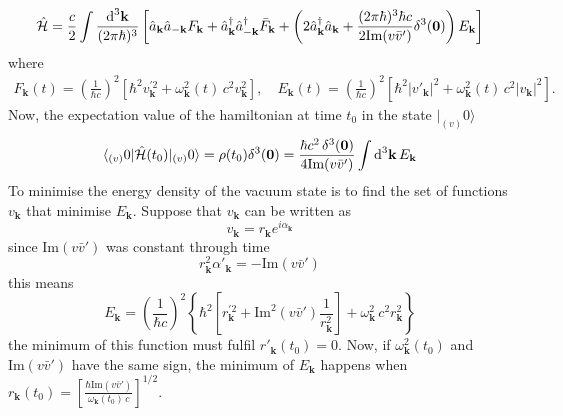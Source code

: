 \begin{equation}
	\hat{\mathcal{H}}=\frac{c}{2}\int\frac{\text{d}^3\mathbf{k}}{(2\pi\hbar)^3}\left[\hat{a}_\mathbf{k}\hat{a}_{-\mathbf{k}}F_\mathbf{k}+\hat{a}^\dagger_\mathbf{k}\hat{a}^\dagger_{-\mathbf{k}}\bar F_\mathbf{k}+\left(2\hat{a}_\mathbf{k}^\dagger\hat{a}_\mathbf{k}+\frac{(2\pi\hbar)^3\hbar c}{2\text{Im}(v\bar v')}\delta^3(\mathbf{0})\right)E_\mathbf{k}\right]
\end{equation}
where
\begin{subequations}
	\begin{gather}
		F_\mathbf{k}(t)=\left(\frac{1}{\hbar c}\right)^2\left[\hbar^2v^{'2}_\mathbf{k}+\omega^2_\mathbf{k}(t)\,c^2 v_\mathbf{k}^2\right],\quad E_\mathbf{k}(t)=\left(\frac{1}{\hbar c}\right)^2\left[\hbar^2\big|v'_\mathbf{k}\big|^2+\omega^2_\mathbf{k}(t)\,c^2 \big|v_\mathbf{k}\big|^2\right].\tag{\theequation \,\,a,b}
	\end{gather}
\end{subequations}
Now, the expectation value of the hamiltonian at time $t_0$ in the state $|_{(v)}0\rangle$
\begin{equation}
	\langle_{(v)}0|\hat{\mathcal{H}}(t_0)|_{(v)}0\rangle=\rho(t_0)\delta^3(\mathbf{0})=\frac{\hbar c^2 \,\delta^3(\mathbf{0})}{4\text{Im}(v\bar v')}\int\text{d}^3\mathbf{k}\,E_\mathbf{k}
\end{equation}
To minimise the energy density of the vacuum state is to find the set of functions $v_\mathbf{k}$ that minimise $E_\mathbf{k}$. Suppose that $v_\mathbf{k}$ can be written as
\begin{equation}
	v_\mathbf{k}=r_\mathbf{k}e^{i\alpha_\mathbf{k}}
\end{equation}
since Im$(v\bar v')$ was constant through time
\begin{equation}
	r_\mathbf{k}^2\alpha'_\mathbf{k}=-\text{Im}(v\bar v')
\end{equation}
this means
\begin{equation}
	E_\mathbf{k}=\left(\frac{1}{\hbar c}\right)^2\left\{\hbar^2\left[r^{'2}_\mathbf{k}+\text{Im}^2\left(v\bar v'\right)\frac{1}{r_\mathbf{k}^2}\right]+\omega^2_\mathbf{k}\,c^2r_\mathbf{k}^2\right\}
\end{equation}
the minimum of this function must fulfil $r'_\mathbf{k}(t_0)=0$. Now, if $\omega_\mathbf{k}^2(t_0)$ and $\text{Im}(v\bar v')$ have the same sign, the minimum of $E_\mathbf{k}$ happens when $r_\mathbf{k}(t_0)=\left[\frac{\hbar\text{Im}(v\bar v')}{\omega_\mathbf{k}(t_0)\,c}\right]^{1/2}$.

